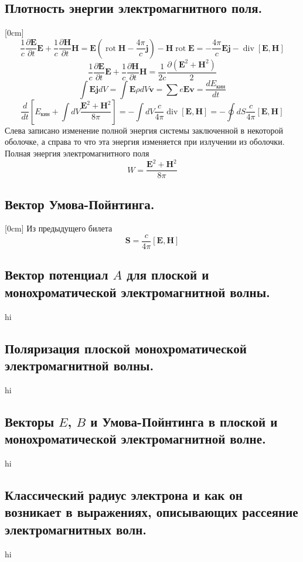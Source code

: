 \documentclass[a4paper,12pt]{article}
\begin{document}
\subsection{Плотность энергии электромагнитного поля.}
[0cm]
\[
\frac{1}{c}\frac{\partial \mathbf{E}}{\partial t}\mathbf{E}+\frac{1}{c}\frac{\partial \mathbf{H}}{\partial t}\mathbf{H}=\mathbf{E}\left(\operatorname{rot}\mathbf{H}-\frac{4\pi}{c}\mathbf{j}\right)-\mathbf{H}\operatorname{rot}\mathbf{E}=-\frac{4\pi}{c}\mathbf{E}\mathbf{j}-\operatorname{div}{[\mathbf{E},\mathbf{H}]}
\]
\[
\frac{1}{c}\frac{\partial \mathbf{E}}{\partial t}\mathbf{E}+\frac{1}{c}\frac{\partial \mathbf{H}}{\partial t}\mathbf{H}=\frac{1}{2c}\frac{\partial (\mathbf{E}^2+\mathbf{H}^2)}{2}
\]
\[\int \mathbf{E}\mathbf{j} dV=\int \mathbf{E}\rho dV \mathbf{v}=\sum e\mathbf{E}\mathbf{v}=\frac{dE_{\text{кин}}}{dt}\]
\[\frac{d}{dt}\left[E_{\text{кин}}+\int dV\frac{\mathbf{E}^2+\mathbf{H}^2}{8\pi}\right]=-\int dV\frac{c}{4\pi}\operatorname{div}{[\mathbf{E},\mathbf{H}]}=-\oint dS \frac{c}{4\pi}[\mathbf{E},\mathbf{H}]\]
Слева записано изменение полной энергия системы заключенной в некоторой оболочке, а справа то что эта энергия изменяется при излучении из оболочки. Полная энергия электромагнитного поля 
\[W=\frac{\mathbf{E}^2+\mathbf{H}^2}{8\pi}\]
\subsection{Вектор Умова-Пойнтинга.}
[0cm]
Из предыдущего билета \[\mathbf{S}=\frac{c}{4\pi}[\mathbf{E},\mathbf{H}]\]
\subsection{Вектор потенциал $A$ для плоской и монохроматической
электромагнитной
волны.}
hi
\subsection{Поляризация плоской монохроматической электромагнитной волны.}
hi
\subsection{Векторы $E$, $B$ и Умова-Пойнтинга в плоской и монохроматической
электромагнитной волне.}
hi
\subsection{Классический радиус электрона и как он возникает в выражениях,
описывающих рассеяние электромагнитных волн.}
hi
\end{document}
